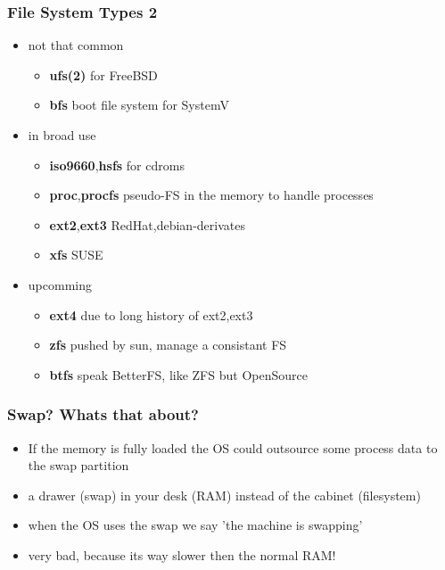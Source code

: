 \documentclass[handout]{beamer}
\begin{document}
        \begin{frame}
			\frametitle{File System Types 2}
            \begin{itemize}
                    \item<1-> not that common
                    \begin{itemize}
                        \item<1-> \textbf{ufs(2)} for FreeBSD
                        \item<1-> \textbf{bfs} boot file system for SystemV
                    \end{itemize}
                    \item<2-> in broad use
                    \begin{itemize}
                        \item<2-> \textbf{iso9660},\textbf{hsfs} for cdroms
                        \item<2-> \textbf{proc},\textbf{procfs} pseudo-FS in the memory to handle processes 
                        \item<2-> \textbf{ext2},\textbf{ext3} RedHat,debian-derivates
                        \item<2-> \textbf{xfs} SUSE 
                    \end{itemize}
                    \item<3-> upcomming
                    \begin{itemize}
                        \item<3-> \textbf{ext4} due to long history of ext2,ext3
                        \item<3-> \textbf{zfs} pushed by sun, manage a consistant FS
                        \item<3-> \textbf{btfs} speak BetterFS, like ZFS but OpenSource
                    \end{itemize}                
            \end{itemize}
		\end{frame}
    	\begin{frame}
			\frametitle{Swap? Whats that about?}
			\begin{itemize}
                \item<1-> If the memory is fully loaded the OS could outsource some process data to the swap partition
                \item<1-> a drawer (swap) in your desk (RAM) instead of the cabinet (filesystem)
                \item<2-> when the OS uses the swap we say 'the machine is swapping'
                \item<2-> very bad, because its way slower then the normal RAM!
            \end{itemize}
		\end{frame}
\end{document}
